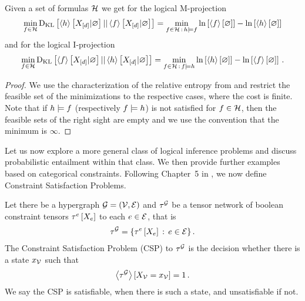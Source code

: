 \begin{theorem}
    Given a set of formulas $\mathcal{H}$ we get for the logical M-projection
    \begin{align*}
        \min_{f\in\mathcal{H}} \mathrm{D}_{\mathrm{KL}}\left[ \left\langle h\right\rangle \left[ X_{[d]} | \varnothing \right] || \left\langle f\right\rangle \left[ X_{[d]} | \varnothing \right] \right]
        = \min_{f\in\mathcal{H}\,:\,h\models f} \ln \left[ \left\langle f\right\rangle \left[ \varnothing \right] \right] - \ln \left[ \left\langle h\right\rangle \left[ \varnothing \right] \right] 
    \end{align*}
    and for the logical I-projection
    \begin{align*}
        \min_{f\in\mathcal{H}} \mathrm{D}_{\mathrm{KL}}\left[ \left\langle f\right\rangle \left[ X_{[d]} | \varnothing \right] || \left\langle h\right\rangle \left[ X_{[d]} | \varnothing \right] \right]
        = \min_{f\in\mathcal{H}\,:\,f\models h} \ln \left[ \left\langle h\right\rangle \left[ \varnothing \right] \right] - \ln \left[ \left\langle f\right\rangle \left[ \varnothing \right] \right] \, .
    \end{align*}
\end{theorem}
\begin{proof}
    We use the characterization of the relative entropy from  and restrict the feasible set of the minimizations to the respective cases, where the cost is finite.
    Note that if $h\models f$ (respectively $f\models h$) is not satisfied for $f\in\mathcal{H}$, then the feasible sets of the right sight are empty and we use the convention that the minimum is $\infty$.
\end{proof}




Let us now explore a more general class of logical inference problems and discuss probabilistic entailment within that class.
We then provide further examples based on categorical constraints.
Following Chapter~5 in \cite{russell_artificial_2021}, we now define Constraint Satisfaction Problems.

\begin{definition}\label{def:csp}
    Let there be a hypergraph $\mathcal{G}=(\mathcal{V},\mathcal{E})$ and $\tau^{\mathcal{G}}$ be a tensor network of boolean constraint tensors $\tau^{e}\left[X_{e}\right]$ to each $e\in\mathcal{E}$, that is
    \begin{align*}
        \tau^{\mathcal{G}} = \{ \tau^{e}\left[X_{e}\right] \,:\, e\in\mathcal{E} \} \, .
    \end{align*}
    The Constraint Satisfaction Problem (CSP) to $\tau^{\mathcal{G}}$ is the decision whether there is a state $x_{\mathcal{V}}$ such that
    \begin{align*}
        \left\langle \tau^{\mathcal{G}}\right\rangle \left[ X_{\mathcal{V}}=x_{\mathcal{V}} \right] = 1 \, .
    \end{align*}
    We say the CSP is satisfiable, when there is such a state, and unsatisfiable if not.
\end{definition}

